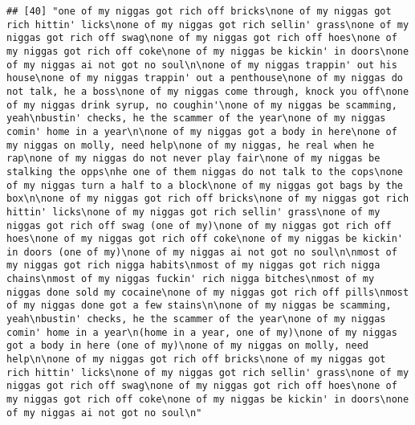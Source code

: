 \documentclass[]{article}
\begin{document}
\begin{verbatim}
## [40] "one of my niggas got rich off bricks\none of my niggas got rich hittin' licks\none of my niggas got rich sellin' grass\none of my niggas got rich off swag\none of my niggas got rich off hoes\none of my niggas got rich off coke\none of my niggas be kickin' in doors\none of my niggas ai not got no soul\n\none of my niggas trappin' out his house\none of my niggas trappin' out a penthouse\none of my niggas do not talk, he a boss\none of my niggas come through, knock you off\none of my niggas drink syrup, no coughin'\none of my niggas be scamming, yeah\nbustin' checks, he the scammer of the year\none of my niggas comin' home in a year\n\none of my niggas got a body in here\none of my niggas on molly, need help\none of my niggas, he real when he rap\none of my niggas do not never play fair\none of my niggas be stalking the opps\nhe one of them niggas do not talk to the cops\none of my niggas turn a half to a block\none of my niggas got bags by the box\n\none of my niggas got rich off bricks\none of my niggas got rich hittin' licks\none of my niggas got rich sellin' grass\none of my niggas got rich off swag (one of my)\none of my niggas got rich off hoes\none of my niggas got rich off coke\none of my niggas be kickin' in doors (one of my)\none of my niggas ai not got no soul\n\nmost of my niggas got rich nigga habits\nmost of my niggas got rich nigga chains\nmost of my niggas fuckin' rich nigga bitches\nmost of my niggas done sold my cocaine\none of my niggas got rich off pills\nmost of my niggas done got a few stains\n\none of my niggas be scamming, yeah\nbustin' checks, he the scammer of the year\none of my niggas comin' home in a year\n(home in a year, one of my)\none of my niggas got a body in here (one of my)\none of my niggas on molly, need help\n\none of my niggas got rich off bricks\none of my niggas got rich hittin' licks\none of my niggas got rich sellin' grass\none of my niggas got rich off swag\none of my niggas got rich off hoes\none of my niggas got rich off coke\none of my niggas be kickin' in doors\none of my niggas ai not got no soul\n"                                                                                                                                                                                                                                                                                                                                                                                                                                                                                                                                                                                                                                                                                                                                                                                                                                                                                                                                                                                                                                                                                                                                                                                                                                                                            
\end{verbatim}
\end{document}
